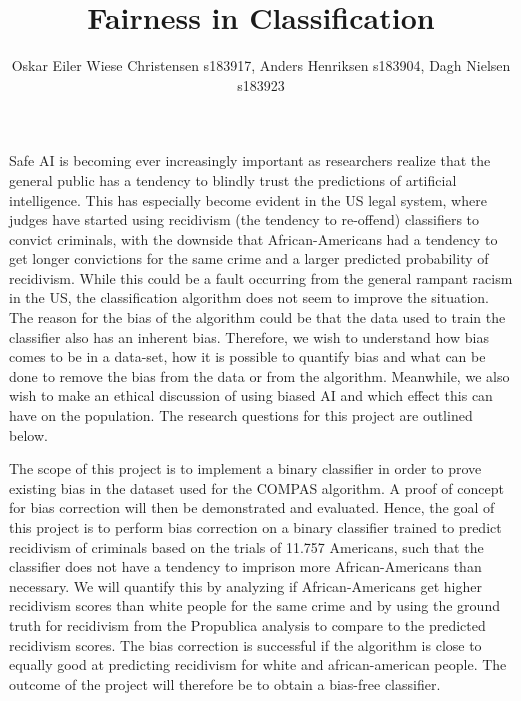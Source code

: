\documentclass[11pt, fleqn]{article}
\title{Fairness in Classification}
\author{\small Oskar Eiler Wiese Christensen s183917, Anders Henriksen s183904, Dagh Nielsen s183923}
\date{}
\begin{document}
	\maketitle
	\vspace*{-0.65cm}	
	\noindent
	Safe AI is becoming ever increasingly important as researchers realize that the general public has a tendency to blindly trust the predictions of artificial intelligence. This has especially become evident in the US legal system, where judges have started using recidivism (the tendency to re-offend) classifiers to convict criminals, with the downside that African-Americans had a tendency to get longer convictions for the same crime and a larger predicted probability of recidivism. While this could be a fault occurring from the general rampant racism in the US, the classification algorithm does not seem to improve the situation. The reason for the bias of the algorithm could be that the data used to train the classifier also has an inherent bias. Therefore, we wish to understand how bias comes to be in a data-set, how it is possible to quantify bias and what can be done to remove the bias from the data or from the algorithm. Meanwhile, we also wish to make an ethical discussion of using biased AI and which effect this can have on the population. The research questions for this project are outlined below. 
	
	The scope of this project is to implement a binary classifier in order to prove existing bias in the dataset used for the COMPAS algorithm. A proof of concept for bias correction will then be demonstrated and evaluated. Hence, the goal of this project is to perform bias correction on a binary classifier trained to predict recidivism of criminals based on the trials of 11.757 Americans, such that the classifier does not have a tendency to imprison more African-Americans than necessary. We will quantify this by analyzing if African-Americans get higher recidivism scores than white people for the same crime and by using the ground truth for recidivism from the Propublica analysis to compare to the predicted recidivism scores. The bias correction is successful if the algorithm is close to equally good at predicting recidivism for white and african-american people. The outcome of the project will therefore be to obtain a bias-free classifier.
	
	\vspace*{-0.4cm}
	
	
\end{document}

